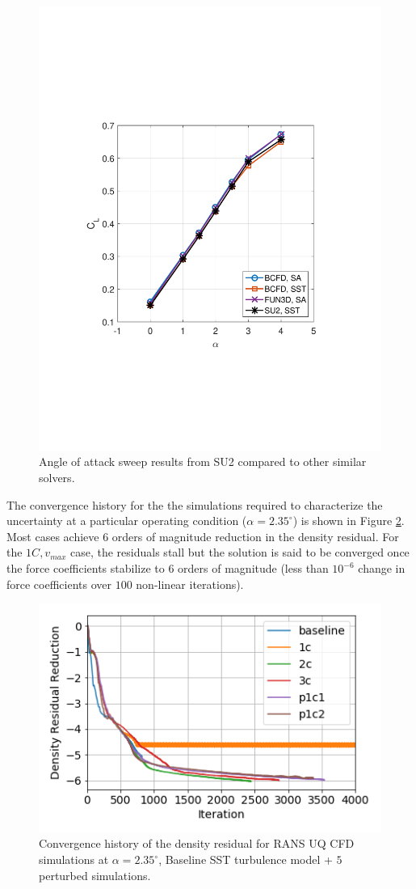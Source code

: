 \begin{figure}{
\centering
    \includegraphics[trim=80 180 80 200, clip, width=.68\textwidth]{suthesis/images/dpw4_alpha_sweep.pdf} 
    \caption{Angle of attack sweep results from SU2 compared to other similar solvers. \label{fig:dpw4_alpha_sweep}}
    \hfill
}
\end{figure}


The convergence history for the the simulations required to characterize the uncertainty at a particular operating condition ($\alpha = 2.35^\circ$) is shown in Figure \ref{fig:convergence_history}. Most cases achieve 6 orders of magnitude reduction in the density residual. For the $1C, v_{max}$ case, the residuals stall but the solution is said to be converged once the force coefficients stabilize to 6 orders of magnitude (less than $10^{-6}$ change in force coefficients over $100$ non-linear iterations).

\begin{figure}{
\centering
    \includegraphics[trim=0 0 0 0, clip, width=.7\textwidth]{suthesis/images/convergence_history.png} 
    \caption{Convergence history of the density residual for RANS UQ CFD simulations at $\alpha = 2.35^\circ$, Baseline SST turbulence model + $5$ perturbed simulations. \label{fig:convergence_history}}
    \hfill
}
\end{figure}

